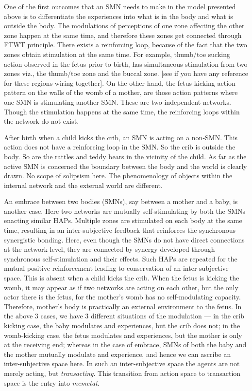 One of the first outcomes that an SMN needs to make in the model presented above is to differentiate the experiences into what is in the body and what is outside the body. 
The modulations of perceptions of one zone affecting the other zone happen at the same time, and therefore these zones get connected through FTWT principle. 
There exists a reinforcing loop, because of the fact that the two zones obtain stimulation at the same time. For example, thumb/toe sucking action observed in the fetus prior to birth, has simultaneous stimulation from two zones viz., the thumb/toe zone and the buccal zone. [see if you have any reference for these regions wiring together]. 
On the other hand, the fetus kicking action-pattern on the walls of the womb of a mother, are those action patterns where one SMN is stimulating another SMN. These are two independent networks. 
Though the stimulation happens at the same time, the reinforcing loops within the network do not exist. 

After birth when a child kicks the crib, an SMN is acting on a non-SMN. This action does not have a reinforcing loop in the SMN. So the crib is outside the body. So are the rattles and teddy bears in the vicinity of the child. 
As far as the active SMN is concerned the boundary between the body and the world is clearly drawn. No scope of solipsism here. The phenomenology of objects within the internal network and the external world are different.

An embrace between two bodies (SMNs), say between a mother and a baby, is another case. Here two networks are mutually self-stimulating by both the SMNs enacting similar HAPs. Multiple zones are stimulated on each body at the same time, resulting in an inter-subjective feedback that reinforces the synchronous synergistic bonding. Here, even though the SMNs do not have direct connections at the network level, they are connected by synergy developed through synchronous self-stimulation and their effects. Such HAPs are repeated for the mutual positive reinforcement leading to conservation of an inter-subjective space. This is absent when a child kicks the crib. When the fetus is kicking the womb, it may appear as if two networks are acting on each other, but the only actor there is the fetus, for the mother's womb has no self-modulating capacity. Therefore, mother's body is practically an external environment to the fetus. In the above 3 cases, we have 3 different situations of the modulation --- in the crib kicking case, the baby modulates and experiences, but the crib does not; in the womb-kicking case, the fetus modulates and experiences, but the mother is only at the receiving end; whereas in the case of embrace, SMNs of both the baby and the mother mutually modulate and experience, and hence we can ascribe an inter-subjective space here.  In such an inter-subjective space the agents are not merely acting, but \textit{transacting}. This transition from action space to transaction space is the entry into \textit{memetat}.

